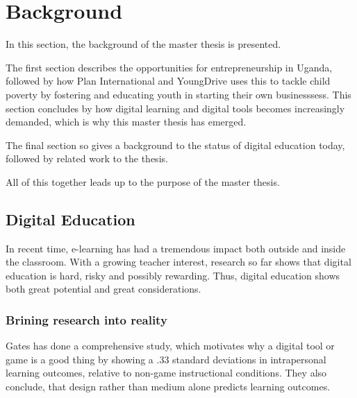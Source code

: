 \section{Background}



    In this section, the background of the master thesis is presented.

    The first section describes the opportunities for entrepreneurship in Uganda, followed by how Plan International and YoungDrive uses this to tackle child poverty by fostering and educating youth in starting their own businesssess. This section concludes by how digital learning and digital tools becomes increasingly demanded, which is why this master thesis has emerged.

    The final section so gives a background to the status of digital education today, followed by related work to the thesis.

    All of this together leads up to the purpose of the master thesis.

    

    

    \subsection{Digital Education}

    In recent time, e-learning has had a tremendous impact both outside and inside the classroom. With a growing teacher interest, research so far shows that digital education is hard, risky and possibly rewarding. Thus, digital education shows both great potential and great considerations.

    \subsubsection{Brining research into reality}

    Gates \cite{gates} has done a comprehensive study, which motivates why a digital tool or game is a good thing by showing a .33 standard deviations in intrapersonal learning outcomes, relative to non-game instructional conditions. They also conclude, that design rather than medium alone predicts learning outcomes.

